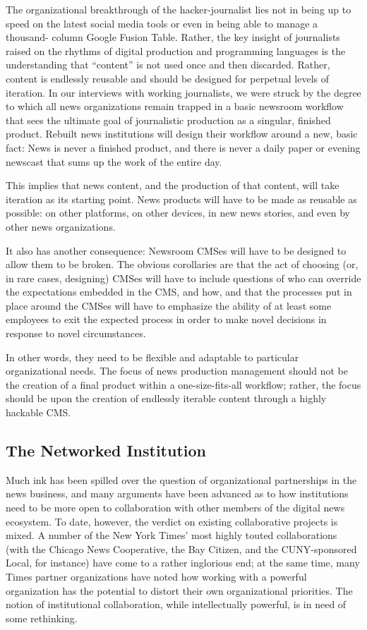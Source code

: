 The organizational breakthrough of the hacker-journalist lies not in being up to
speed on the latest social media tools or even in being able to manage a thousand-
column Google Fusion Table. Rather, the key insight of journalists raised
on the rhythms of digital production and programming languages is the understanding
that ``content'' is not used once and then discarded. Rather, content is
endlessly reusable and should be designed for perpetual levels of iteration. In our
interviews with working journalists, we were struck by the degree to which all
news organizations remain trapped in a basic newsroom workflow that sees the
ultimate goal of journalistic production as a singular, finished product. Rebuilt
news institutions will design their workflow around a new, basic fact: News is
never a finished product, and there is never a daily paper or evening newscast that
sums up the work of the entire day.

This implies that news content, and the production of that content, will take
iteration as its starting point. News products will have to be made as reusable as
possible: on other platforms, on other devices, in new news stories, and even by
other news organizations.

It also has another consequence: Newsroom CMSes will have to be designed to
allow them to be broken. The obvious corollaries are that the act of choosing
(or, in rare cases, designing) CMSes will have to include questions of who can
override the expectations embedded in the CMS, and how, and that the processes
put in place around the CMSes will have to emphasize the ability of at least
some employees to exit the expected process in order to make novel decisions in
response to novel circumstances.

In other words, they need to be flexible and adaptable to particular organizational
needs. The focus of news production management should not be the
creation of a final product within a one-size-fits-all workflow; rather, the focus
should be upon the creation of endlessly iterable content through a highly
hackable CMS.

\subsection{The Networked Institution}
Much ink has been spilled over the question of organizational partnerships in the
news business, and many arguments have been advanced as to how institutions
need to be more open to collaboration with other members of the digital news
ecosystem. To date, however, the verdict on existing collaborative projects is mixed.
A number of the New York Times’ most highly touted collaborations (with the
Chicago News Cooperative, the Bay Citizen, and the CUNY-sponsored Local,
for instance) have come to a rather inglorious end; at the same time, many Times
partner organizations have noted how working with a powerful organization has
the potential to distort their own organizational priorities. The notion of institutional
collaboration, while intellectually powerful, is in need of some rethinking.


